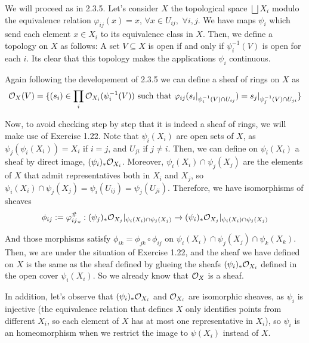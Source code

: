 \begin{sol}
	We will proceed as in 2.3.5. Let's consider $X$ the topological space $\bigsqcup X_i$ modulo the equivalence relation $\varphi_{ij}(x) = x$, $\forall x \in U_{ij}, \, \, \forall i,j$. We have maps $\psi_i$ which send each element $x \in X_i$ to its equivalence class in $X$. Then, we define a topology on $X$ as follows: A set $V \subseteq X$ is open if and only if $\psi_i^{-1}(V)$ is open for each $i$. Its clear that this topology makes the applications $\psi_i$ continuous.


	Again following the developement of 2.3.5 we can define a sheaf of rings on $X$ as 
	\[
		\mathcal{O}_X(V) = \{(s_i) \in \prod_i \mathcal{O}_{X_i}(\psi_i^{-1}(V)) \text{ such that } \varphi_{ij}(s_i|_{\psi_i^{-1}(V) \cap U_{ij}}) = s_j|_{\psi_j^{-1}(V) \cap U_{ji}} \}
	\]
 
	Now, to avoid checking step by step that it is indeed a sheaf of rings, we will make use of Exercise 1.22. Note that $\psi_i(X_i)$ are open sets of $X$, as $\psi_j(\psi_i(X_i)) = X_i$ if $i = j$, and $U_{ji}$ if $j \neq i$. Then, we can define on $\psi_i(X_i)$ a sheaf by direct image, $(\psi_i)_* \mathcal{O}_{X_i}$. Moreover, $\psi_i(X_i) \cap \psi_j(X_j)$ are the elements of $X$ that admit representatives both in $X_i$ and $X_j$, so $\psi_i(X_i) \cap \psi_j(X_j) = \psi_i(U_{ij}) = \psi_j(U_{ji})$. Therefore, we have isomorphisms of sheaves 
	\[
		\phi_{ij} := {\varphi_{ij}^{\#}}_* : (\psi_j)_* \mathcal{O}_{X_j}|_{\psi_i(X_i) \cap \psi_j(X_j)} \to (\psi_i)_* \mathcal{O}_{X_j}|_{\psi_i(X_i) \cap \psi_j(X_j)}
	\]

	And those morphisms satisfy $\phi_{ik} = \phi_{jk} \circ \phi_{ij}$ on $\psi_i(X_i) \cap \psi_j(X_j) \cap \psi_k(X_k)$. Then, we are under the situation of Exercise 1.22, and the sheaf we have defined on $X$ is the same as the sheaf defined by glueing the sheafs $(\psi_i)_* \mathcal{O}_{X_i}$ defined in the open cover $\psi_i(X_i)$. So we already know that $\mathcal{O}_X$ is a sheaf. 

	In addition, let's observe that $(\psi_i)_* \mathcal{O}_{X_i}$ and $\mathcal{O}_{X_i}$ are isomorphic sheaves, as $\psi_i$ is injective (the equivalence relation that defines $X$ only identifies points from different $X_i$, so each element of $X$ has at most one representative in $X_i$), so $\psi_i$ is an homeomorphism when we restrict the image to $\psi(X_i)$ instead of $X$.


\end{sol}
